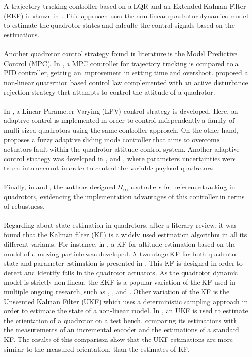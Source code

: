 \\\\
A trajectory tracking controller based on a LQR and an Extended Kalman Filter (EKF) is shown in \cite{Zhang2016}. This approach uses the non-linear quadrotor dynamics model to estimate the quadrotor states and calculte the control signals based on the estimations.
\\\\
Another quadrotor control strategy found in literature is the Model Predictive Control (MPC). In \cite{Configuration2017}, a MPC controller for trajectory tracking is compared to a PID controller, getting an improvement in setting time and overshoot. \cite{Castillo201603a} proposed a non-linear quaternion based control law complemented with an active disturbance rejection strategy that attempts to control the attitude of a quadrotor.
\\\\
In \cite{Ameho2013}, a Linear Parameter-Varying (LPV) control strategy is developed. Here, an adaptive control is implemented in order to control independently a family of multi-sized quadrotors using the same controller approach. On the other hand, \cite{Gao2015} proposes a fuzzy adaptive sliding mode
controller that aims to overcome actuators fault within the quadrotor attitude control system. Another adaptive control strategy was developed in \cite{Wang2017a}, \cite{Emran2015} and \cite{Wang2017}, where parameters uncertainties were taken into account in order to control the variable payload quadrotors.
\\\\
Finally, in \cite{Prayitno2016} and \cite{Ortiz2016}, the authors designed $H_{\infty}$ controllers for reference tracking in quadrotors, evidencing the implementation advantages of this controller in terms of robustness.
\\\\
Regarding about state estimation in quadrotors, after a literary review, it was found that the Kalman filter (KF) is a widely used estimation algorithm in all its different variants. For instance, in \cite{Munoz2017}, a KF for altitude estimation based on the model of a moving particle was developed. A two stage KF for both quadrotor state and parameter estimation is presented in \cite{Moghadam2015}. This KF is designed in order to detect and identify fails in the quadrotor actuators. As the quadrotor dynamic model is strictly non-linear, the EKF is a popular variation of the KF used in multiple ongoing research, such as \cite{Goodarzi2016}, \cite{Oh2015}, and \cite{Sebesta2014}. Other variation of the KF is the Unscented Kalman Filter (UKF) which uses a deterministic sampling approach in order to estimate the state of a non-linear model. In \cite{Goslinski2013}, an UKF is used to estimate the orientation of a quadrotor on a test bench, comparing its estimations with the measurements of an incremental encoder and the estimations of a standard KF. The results of this comparison show that the UKF estimations are more similar to the measured orientation, than the estimates of KF.
